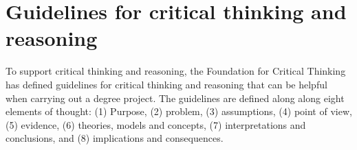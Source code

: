 \documentclass[a4paper,12pt]{book}
\begin{document}
\section{Guidelines for critical thinking and reasoning}
To support critical thinking and reasoning, the Foundation for Critical Thinking \cite{paul2008miniature} has defined guidelines for critical thinking and reasoning
that can be helpful when carrying out a degree project.
The guidelines are defined along along eight elements of thought:
(1) Purpose, (2) problem, (3) assumptions, (4) point of view, (5) evidence,
(6) theories, models and concepts, (7) interpretations and conclusions, and
(8) implications and consequences.
\end{document}
